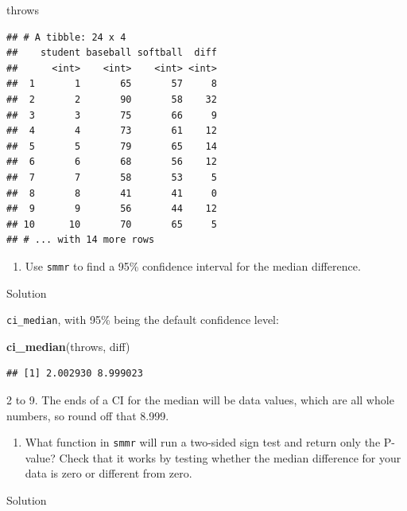 \documentclass[]{tufte-book}
\newenvironment{Shaded}{}{}
\newcommand{\KeywordTok}[1]{\textcolor[rgb]{0.00,0.44,0.13}{\textbf{#1}}}
\newcommand{\NormalTok}[1]{#1}
\providecommand{\tightlist}{%
  \setlength{\itemsep}{0pt}\setlength{\parskip}{0pt}}
\theoremstyle{definition}
\theoremstyle{definition}
\theoremstyle{definition}
\theoremstyle{remark}
\begin{document}
\begin{Shaded}
\begin{Highlighting}[]
\NormalTok{throws}
\end{Highlighting}
\end{Shaded}

\begin{verbatim}
## # A tibble: 24 x 4
##    student baseball softball  diff
##      <int>    <int>    <int> <int>
##  1       1       65       57     8
##  2       2       90       58    32
##  3       3       75       66     9
##  4       4       73       61    12
##  5       5       79       65    14
##  6       6       68       56    12
##  7       7       58       53     5
##  8       8       41       41     0
##  9       9       56       44    12
## 10      10       70       65     5
## # ... with 14 more rows
\end{verbatim}

\begin{enumerate}
\def\labelenumi{(\alph{enumi})}
\setcounter{enumi}{1}
\tightlist
\item
  Use \texttt{smmr} to find a 95\% confidence interval for the median
  difference.
\end{enumerate}

Solution

\texttt{ci\_median}, with 95\% being the default confidence level:

\begin{Shaded}
\begin{Highlighting}[]
\KeywordTok{ci_median}\NormalTok{(throws, diff)}
\end{Highlighting}
\end{Shaded}

\begin{verbatim}
## [1] 2.002930 8.999023
\end{verbatim}

2 to 9. The ends of a CI for the median will be data values, which are
all whole numbers, so round off that 8.999.

\begin{enumerate}
\def\labelenumi{(\alph{enumi})}
\setcounter{enumi}{2}
\tightlist
\item
  What function in \texttt{smmr} will run a two-sided sign test and
  return only the P-value? Check that it works by testing whether the
  median difference for your data is zero or different from zero.
\end{enumerate}

Solution
\end{document}
